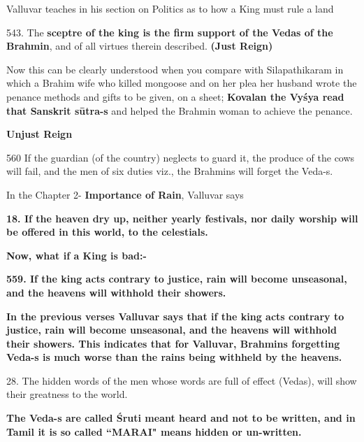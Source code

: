 Valluvar teaches in his section on Politics as to how a King must rule a land

543. The \textbf{sceptre of the king is the firm support of the Vedas of the Brahmin}, and of all virtues therein described. \textbf{(Just Reign)}

Now this can be clearly understood when you compare with Silapathikaram in which a Brahim wife who killed mongoose and on her plea her husband wrote the penance methods and gifts to be given, on a sheet; \textbf{Kovalan the Vyśya read that Sanskrit sūtra-s} and helped the Brahmin woman to achieve the penance.

\textbf{Unjust Reign}

560  If the guardian (of the country) neglects to guard it, the produce of the cows will fail, and the men of six duties viz., the Brahmins will forget the Veda-s.

In the Chapter 2- \textbf{Importance of Rain}, Valluvar says

\textbf{18. If the heaven dry up, neither yearly festivals, nor daily worship will be offered in this world, to the celestials.}

\textbf{Now, what if a King is bad:-}

\textbf{559. If the king acts contrary to justice, rain will become unseasonal, and the heavens will withhold their showers.}

\textbf{In the previous verses Valluvar says that if the king acts contrary to justice, rain will become unseasonal, and the heavens will withhold their showers. This indicates that for Valluvar, Brahmins forgetting Veda-s is much worse than the rains being withheld by the heavens.}

 28. The hidden words of the men whose words are full of effect (Vedas), will show their greatness to the world.

\textbf{The Veda-s are called Śruti meant heard and not to be written, and in Tamil it is so called “MARAI" means hidden or un-written.}

